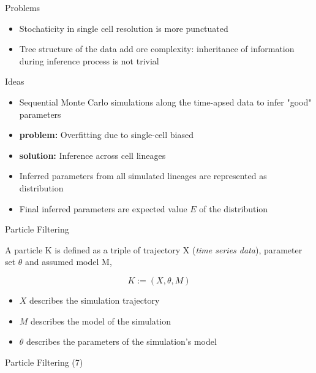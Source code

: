 \documentclass[pdf]
{beamer}
\begin{document}
\begin{frame}{Problems}
	\begin{itemize}
	\item Stochaticity in single cell resolution is more punctuated
	\item Tree structure of the data add ore complexity: inheritance of information during inference process is not trivial
	\end{itemize}
\end{frame}

\begin{frame}{Ideas}
	\begin{itemize}
	\item Sequential Monte Carlo simulations along the time-apsed data to infer "good" parameters
	\item<2-> \textbf{problem:} Overfitting due to single-cell biased
	\item<3-> \textbf{solution:} Inference across cell lineages
	\item<4-> Inferred parameters from all simulated lineages are represented as distribution
	\item<5-> Final inferred parameters are expected value $E$ of the distribution
	\end{itemize}
\end{frame}

\begin{frame}{Particle Filtering}

	A particle K is defined as a triple of trajectory X (\textit{time series data}), parameter set $\theta$ and
assumed model M,

	\begin{equation}
	K := (X, \theta, M)
	\end{equation}
	\begin{itemize}
		\item $X$ describes the simulation trajectory
		\item $M$ describes the model of the simulation
		\item $\theta$ describes the parameters of the simulation's model
	\end{itemize}
\end{frame}

\begin{frame}{Particle Filtering (7)}

\end{frame}
\end{document}
